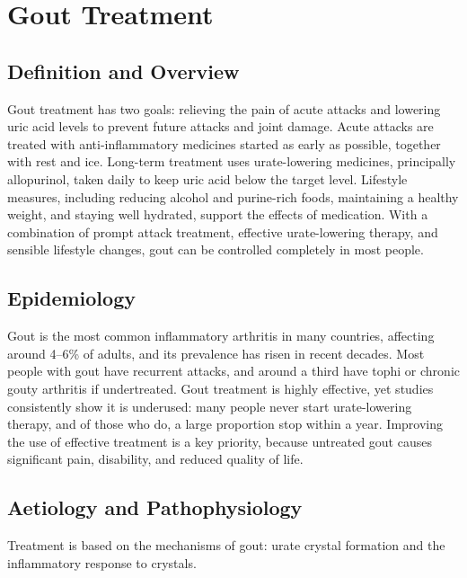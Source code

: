 \chapter{Gout Treatment}

\section*{Definition and Overview}
Gout treatment has two goals: relieving the pain of acute attacks and lowering uric acid levels to prevent future attacks and joint damage. Acute attacks are treated with anti-inflammatory medicines started as early as possible, together with rest and ice. Long-term treatment uses urate-lowering medicines, principally allopurinol, taken daily to keep uric acid below the target level. Lifestyle measures, including reducing alcohol and purine-rich foods, maintaining a healthy weight, and staying well hydrated, support the effects of medication. With a combination of prompt attack treatment, effective urate-lowering therapy, and sensible lifestyle changes, gout can be controlled completely in most people.

\section*{Epidemiology}
Gout is the most common inflammatory arthritis in many countries, affecting around 4--6\% of adults, and its prevalence has risen in recent decades. Most people with gout have recurrent attacks, and around a third have tophi or chronic gouty arthritis if undertreated. Gout treatment is highly effective, yet studies consistently show it is underused: many people never start urate-lowering therapy, and of those who do, a large proportion stop within a year. Improving the use of effective treatment is a key priority, because untreated gout causes significant pain, disability, and reduced quality of life.

\section*{Aetiology and Pathophysiology}
Treatment is based on the mechanisms of gout: urate crystal formation and the inflammatory response to crystals.

